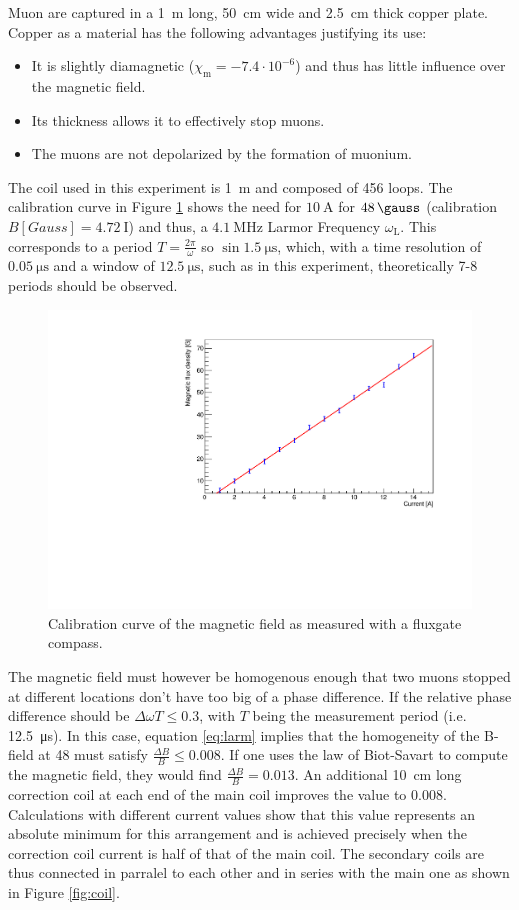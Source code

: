 Muon are captured in a \SI{1}{\meter} long, \SI{50}{\centi\meter} wide and \SI{2.5}{\centi\meter} thick copper plate. Copper as a material has the following advantages justifying its use:

\begin{itemize}
\item It is slightly diamagnetic ($\chi_{\text{m}}=-7.4 \cdot 10^{-6}$) and thus has little influence over the magnetic field.
\item Its thickness allows it to effectively stop muons.
\item The muons are not depolarized by the formation of muonium.
\end{itemize}

The coil used in this experiment is \SI{1}{\meter} and composed of 456 loops. The calibration curve in Figure \ref{fig:magcal} shows the need for $\SI{10}{\ampere}$ for $\SI{48}{\gauss}$ (calibration $B[Gauss]=\SI{4.72}{\text{I}}$) and thus, a $\SI{4.1}{\mega\hertz}$ Larmor Frequency $\omega_{\text{L}}$. This corresponds to a period $T=\frac{2\pi}{\omega}$ so $\sin \SI{1.5}{\micro\second}$, which, with a time resolution of $\SI{0.05}{\micro\second}$ and a window of $\SI{12.5}{\micro\second}$, such as in this experiment, theoretically 7-8 periods should be observed.

\begin{figure}[htbp]
\centering
\includegraphics[width=0.7\linewidth]{./fig/magcal.pdf}
\caption{Calibration curve of the magnetic field as measured with a fluxgate compass.}
\label{fig:magcal}
\end{figure}


The magnetic field must however be homogenous enough that two muons stopped at different locations don't have too big of a phase difference. If the relative phase difference should be $\Delta\omega T \leq 0.3$, with $T$ being the measurement period (i.e. \SI{12.5}{\micro\second}). In this case, equation \ref{eq:larm} implies that the homogeneity of the B-field at \SI{48}{\gauss} must satisfy $\frac{\Delta B}{B}\leq 0.008$. If one uses the law of Biot-Savart to compute the magnetic field, they would find $\frac{\Delta B}{B}=0.013$. An additional \SI{10}{\centi\meter} long correction coil at each end of the main coil improves the value to 0.008. Calculations with different current values show that this value represents an absolute minimum for this arrangement and is achieved precisely when the correction coil current is half of that of the main coil. The secondary coils are thus connected in parralel to each other and in series with the main one as shown in Figure \ref{fig:coil}.

